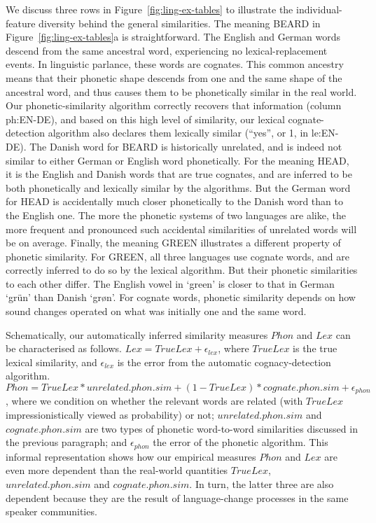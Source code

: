 \documentclass[a4]{article}
\newcommand{\+}[1]{\mathbf{#1}}
\begin{document}
We discuss three rows in Figure~\ref{fig:ling-ex-tables} to illustrate the individual-feature diversity behind the general similarities. The meaning BEARD in Figure~\ref{fig:ling-ex-tables}a is straightforward. The English and German words descend from the same ancestral word, experiencing no lexical-replacement events. In linguistic parlance, these words are cognates. This common ancestry means that their phonetic shape descends from one and the same shape of the ancestral word, and thus causes them to be phonetically similar in the real world. Our phonetic-similarity algorithm correctly recovers that information (column ph:EN-DE), and based on this high level of similarity, our lexical cognate-detection algorithm also declares them lexically similar (``yes'', or 1, in le:EN-DE). The Danish word for BEARD is historically unrelated, and is indeed not similar to either German or English word phonetically. For the meaning HEAD, it is the English and Danish words that are true cognates, and are inferred to be both phonetically and lexically similar by the algorithms. But the German word for HEAD is accidentally much closer phonetically to the Danish word than to the English one. The more the phonetic systems of two languages are alike, the more frequent and pronounced such accidental similarities of unrelated words will be on average. Finally, the meaning GREEN illustrates a different property of phonetic similarity. For GREEN, all three languages use cognate words, and are correctly inferred to do so by the lexical algorithm. But their phonetic similarities to each other differ. The English vowel in `green' is closer to that in German `gr\"{u}n'  than Danish `gr\o{}n'. For cognate words, phonetic similarity depends on how sound changes operated on what was initially one and the same word. 

Schematically, our automatically inferred similarity measures $Phon$ and $Lex$ can be characterised as follows. $Lex = TrueLex + \epsilon_{lex}$, where $TrueLex$ is the true lexical similarity, and $\epsilon_{lex}$ is the error from the automatic cognacy-detection algorithm. $Phon = TrueLex*unrelated.phon.sim + (1-TrueLex)*cognate.phon.sim + \epsilon_{phon}$, where we condition on whether the relevant words are related (with $TrueLex$ impressionistically viewed as probability) or not; $unrelated.phon.sim$ and $cognate.phon.sim$ are two types of phonetic word-to-word similarities discussed in the previous paragraph; and $\epsilon_{phon}$ the error of the phonetic algorithm. This informal representation shows how our empirical measures $Phon$ and $Lex$ are even more dependent than the real-world quantities $TrueLex$, $unrelated.phon.sim$ and $cognate.phon.sim$. In turn, the latter three are also dependent because they are the result of language-change processes in the same speaker communities. 
\end{document}
